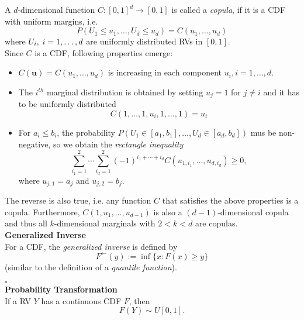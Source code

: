 
A $d$-dimensional function $C: [0,1]^d \rightarrow [0,1]$ is called a \textit{copula}, if it is a \ac{CDF} with uniform margins, i.e.
\begin{equation*}
P\left(U_{1} \leq u_{1}, \ldots, U_{d} \leq u_{d}\right)=C\left(u_{1}, \ldots, u_{d}\right)
\end{equation*}
where 
$ U_{i}, \hspace{0.25em} i = 1, \ldots, d $ 
are uniformly distributed \acp{RV} in $[0,1]$.\\
Since $C$ is a \ac{CDF}, following properties emerge:
\begin{itemize}
\item $C(\mathbf{u})=C\left(u_{1}, \ldots, u_{d}\right)$ is increasing in each component $u_i, i = 1, \ldots, d$.
\item The $i^{th}$ marginal distribution is obtained by setting $u_j = 1$ for $j \neq i$ and it has to be uniformly distributed $$C\left(1, \ldots, 1, u_{i}, 1, \ldots, 1\right)=u_{i}$$
\item For $a_i \leq b_i$, the probability $P\left(U_{1} \in\left[a_{1}, b_{1}\right], \ldots, U_{d} \in\left[a_{d}, b_{d}\right]\right)$ mus be non-negative, so we obtain the \textit{rectangle inequality} 
\begin{equation}
\sum_{i_{1}=1}^{2} \cdots \sum_{i_{d}=1}^{2}(-1)^{i_{1}+\cdots+i_{d}} C\left(u_{1, i_{1}}, \ldots, u_{d, i_{d}}\right) \geq 0,
\end{equation}
where $u_{j,1} = a_j$ and $u_{j,2} = b_j$.
\label{eq:rectangle_inequality}
\end{itemize}
The reverse is also true, i.e. any function $C$ that satisfies the above properties is a copula. Furthermore, $C\left(1, u_{1}, \ldots, u_{d-1}\right)$ is also a $(d-1)$-dimensional copula and thus all $k$-dimensional marginals with $2<k<d$ are copulas.\\ 

\textbf{Generalized Inverse}\\
For a \ac{CDF}, the \textit{generalized inverse} is defined by
$$
F^{\leftarrow}(y):=\inf \{x: F(x) \geq y\}
\label{eq:generalized_inverse}
$$
(similar to the definition of a \textit{quantile function}).

\hfill $\square$ \\

\textbf{Probability Transformation}\\
If a \ac{RV} $Y$ has a continuous \ac{CDF} $F$, then
\begin{equation}
F(Y) \sim U[0,1].
\label{eq:probability_transformation}
\end{equation}

